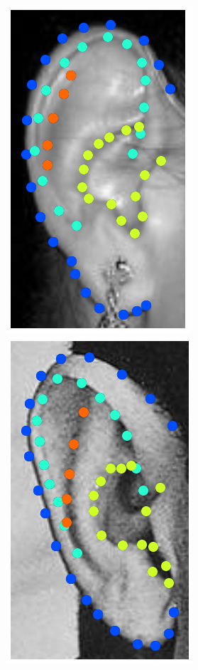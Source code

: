 \begin{figure}[!b]
    \hfill
    \includegraphics[height=\flowh]{resources/Ear_Deformable_Model/dbs/db_2}
    \hfill
    \includegraphics[height=\flowh]{resources/Ear_Deformable_Model/dbs/db_3}
    \hfill

\end{figure}
